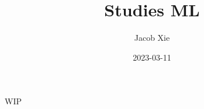 \documentclass[UTF8]{ctexart}
\title{Studies ML}
\author{Jacob Xie}
\date{2023-03-11}
\begin{document}
\maketitle
\newpage

WIP
\end{document}
